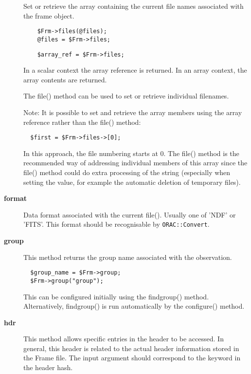 \begin{description}
Set or retrieve the array containing the current file names
associated with the frame object.

\begin{verbatim}
    $Frm->files(@files);
    @files = $Frm->files;
\end{verbatim}
\begin{verbatim}
    $array_ref = $Frm->files;
\end{verbatim}


In a scalar context the array reference is returned.
In an array context, the array contents are returned.



The file() method can be used to set or retrieve individual
filenames.



Note: It is possible to set and retrieve the array members using
the array reference rather than the file() method:

\begin{verbatim}
  $first = $Frm->files->[0];
\end{verbatim}


In this approach, the file numbering starts at 0. The file() method
is the recommended way of addressing individual members of this
array since the file() method could do extra processing of the
string (especially when setting the value, for example the automatic
deletion of temporary files).

\item[\textbf{format}] \mbox{}

Data format associated with the current file().
Usually one of 'NDF' or 'FITS'. This format should be
recognisable by \texttt{ORAC::Convert}.

\item[\textbf{group}] \mbox{}

This method returns the group name associated with the observation.

\begin{verbatim}
  $group_name = $Frm->group;
  $Frm->group("group");
\end{verbatim}


This can be configured initially using the findgroup() method.
Alternatively, findgroup() is run automatically by the configure()
method.

\item[\textbf{hdr}] \mbox{}

This method allows specific entries in the header to be accessed.  In
general, this header is related to the actual header information
stored in the Frame file. The input argument should correspond to the
keyword in the header hash.


\end{description}

